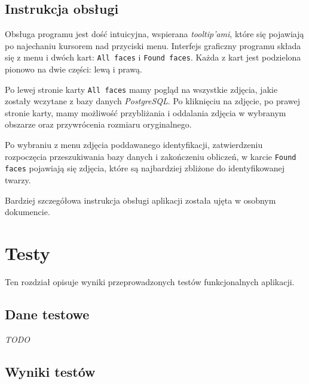 \documentclass[a4paper,titlepage]{article}
\theoremstyle{break}
\numberwithin{equation}{subsection}
\begin{document}

\subsection{Instrukcja obsługi}

Obsługa programu jest dość intuicyjna, wspierana \emph{tooltip'ami}, które się pojawiają po najechaniu kursorem nad przyciski menu. Interfejs graficzny programu składa się z menu i dwóch kart: \texttt{All faces} i \texttt{Found faces}. Każda z  kart jest podzielona pionowo na dwie części: lewą i prawą.

Po lewej stronie karty \texttt{All faces} mamy pogląd na wszystkie zdjęcia, jakie zostały wczytane z bazy danych \emph{PostgreSQL}. Po kliknięciu na zdjęcie, po prawej stronie karty, mamy możliwość przybliżania i oddalania zdjęcia w wybranym obszarze oraz przywrócenia rozmiaru oryginalnego.

Po wybraniu z menu zdjęcia poddawanego identyfikacji, zatwierdzeniu rozpoczęcia przeszukiwania bazy danych i zakończeniu obliczeń, w karcie \texttt{Found faces} pojawiają się zdjęcia, które są najbardziej zbliżone do identyfikowanej twarzy. %

Bardziej szczegółowa instrukcja obsługi aplikacji została ujęta w osobnym dokumencie.


\section{Testy}
\label{sec:testy}

Ten rozdział opisuje wyniki przeprowadzonych testów funkcjonalnych aplikacji.


\subsection{Dane testowe}

\emph{TODO}


\subsection{Wyniki testów}
\end{document}
